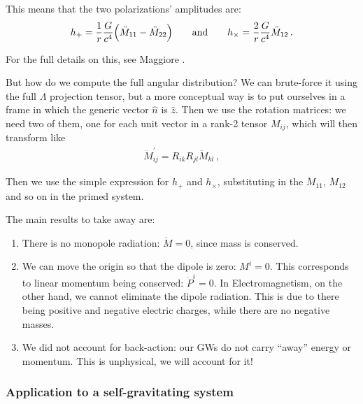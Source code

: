 \documentclass[main.tex]{subfiles}
\begin{document}


This means that the two polarizations' amplitudes are:
%
\begin{align}
h_{+} = \frac{1}{r} \frac{G}{c^{4}} \qty(\ddot{M}_{11} - \ddot{M}_{22})  \qquad \text{and} \qquad
h_{ \times } = \frac{2}{r} \frac{G}{c^{4}} \ddot{M}_{12}
\,.
\end{align}

For the full details on this, see Maggiore \cite[eqs.\ 3.60 to 3.72]{maggioreGravitationalWavesVolume2007}.

But how do we compute the full angular distribution? 
We can brute-force it using the full \(\Lambda \) projection tensor, but a more conceptual way is to put ourselves in a frame in which the generic vector \(\hat{n}\) is \(\hat{z}\). 
Then we use the rotation matrices: we need two of them, one for each unit vector in a rank-2 tensor \(M_{ij}\), which will then transform like 
%
\begin{align}
\ddot{M}_{ij}^{\prime } = R_{ik} R_{jl} \ddot{M}_{kl}
\,,
\end{align}

Then we use the simple expression for \(h_{+}\) and \(h_{ \times }\), substituting in the \(\ddot{M}_{11}\), \(\ddot{M}_{12}\) and so on in the primed system. 

The main results to take away are: 
\begin{enumerate}
  \item There is no monopole radiation: \(\dot{M} = 0\), since mass is conserved.
  \item We can move the origin so that the dipole is zero: \(M^{i} =0 \). This corresponds to linear momentum being conserved: \(\dot{P}^{i}=0\). In Electromagnetism, on the other hand, we cannot eliminate the dipole radiation. This is due to there being positive and negative electric charges, while there are no negative masses. 
  \item We did not account for back-action: our GWs do not carry ``away'' energy or momentum. This is unphysical, we will account for it!
\end{enumerate}

\subsubsection{Application to a self-gravitating system}
\end{document}
